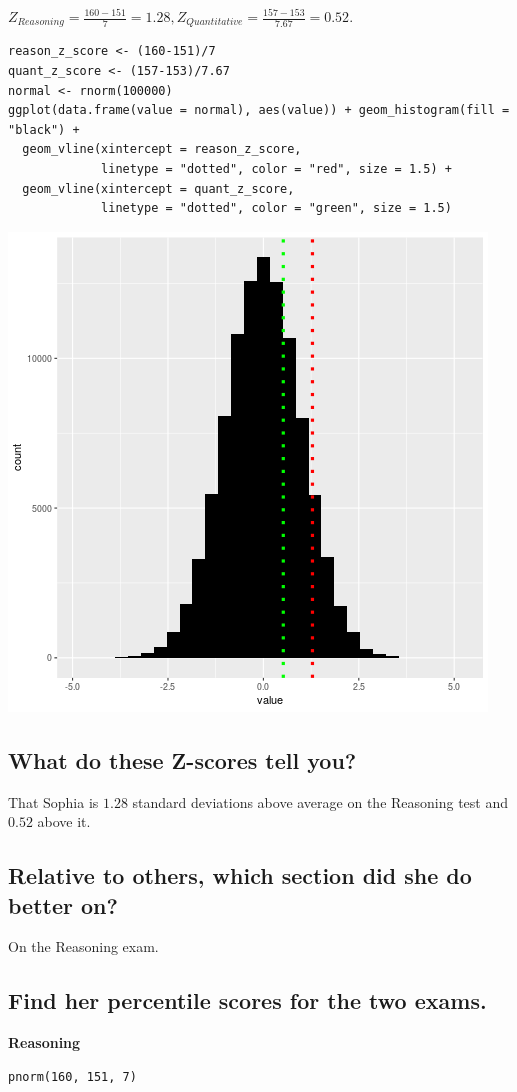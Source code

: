 \documentclass[11pt]{article}
\begin{document}
\(Z_{Reasoning} = \frac{160 - 151}{7} = 1.28, Z_{Quantitative} = \frac{157 - 153}{7.67} = 0.52\).

\begin{verbatim}
reason_z_score <- (160-151)/7
quant_z_score <- (157-153)/7.67
normal <- rnorm(100000)
ggplot(data.frame(value = normal), aes(value)) + geom_histogram(fill = "black") +
  geom_vline(xintercept = reason_z_score,
             linetype = "dotted", color = "red", size = 1.5) +
  geom_vline(xintercept = quant_z_score,
             linetype = "dotted", color = "green", size = 1.5)
\end{verbatim}

\begin{center}
\includegraphics[width=.9\linewidth]{z_scores.png}
\end{center}

\subsection{What do these Z-scores tell you?}
\label{sec:org3b82be2}
That Sophia is \(1.28\) standard deviations above average on the Reasoning test and \(0.52\) above it. 
\subsection{Relative to others, which section did she do better on?}
\label{sec:org8fb7c6f}
On the Reasoning exam.
\subsection{Find her percentile scores for the two exams.}
\label{sec:org6f30518}
\textbf{Reasoning}
\begin{verbatim}
pnorm(160, 151, 7)
\end{verbatim}
\end{document}

